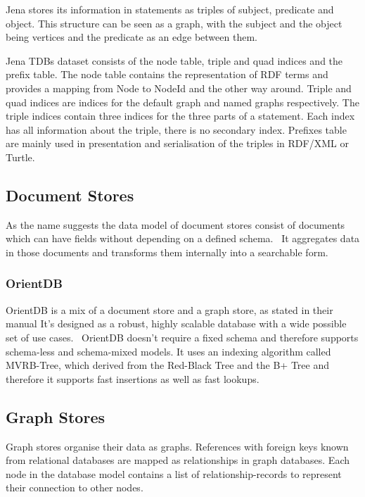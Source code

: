 Jena stores its information in statements as triples of subject, predicate and object.
This structure can be seen as a graph, with the subject and the object being vertices and the predicate as an edge between them.

Jena TDBs dataset consists of the node table, triple and quad indices and the prefix table.
The node table contains the representation of RDF terms and provides a mapping from Node to NodeId and the other way around.
Triple and quad indices are indices for the default graph and named graphs respectively.
The triple indices contain three indices for the three parts of a statement.
Each index has all information about the triple,
there is no secondary index.
Prefixes table are mainly used in presentation and serialisation of the triples in RDF/XML or Turtle.~\cite{ApacheTDB}

\subsection{Document Stores}
As the name suggests the data model of document stores consist of documents which can have fields without depending on a defined schema.~\cite{OrientDB}
It aggregates data in those documents and transforms them internally into a searchable form.~\cite{Techopedia2017}

\subsubsection{OrientDB}
OrientDB is a mix of a document store and a graph store,
as stated in their manual 
It's designed as a robust, highly scalable database with a wide possible set of use cases.~\cite{OrientDB}
OrientDB doesn't require a fixed schema and therefore supports schema-less and schema-mixed models.
It uses an indexing algorithm called MVRB-Tree,
which derived from the Red-Black Tree and the B+ Tree and therefore it supports fast insertions as well as fast lookups.~\cite{Abubakar2014}

\subsection{Graph Stores}
\label{ch:background:se:graphStores}
Graph stores organise their data as graphs.
References with foreign keys known from relational databases are mapped as relationships in graph databases.
Each node in the database model contains a list of relationship-records to represent their connection to other nodes.~\cite{NeoTechnologyInc.2016}

